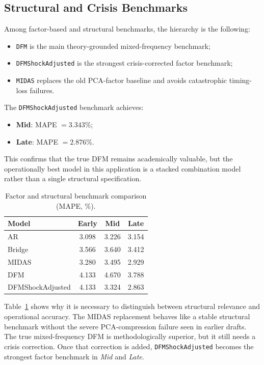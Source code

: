 \documentclass[12pt,a4paper]{report}
\begin{document}
\subsection{Structural and Crisis Benchmarks}

Among factor-based and structural benchmarks, the hierarchy is the following:
\begin{itemize}
    \item \texttt{DFM} is the main theory-grounded mixed-frequency benchmark;
    \item \texttt{DFMShockAdjusted} is the strongest crisis-corrected factor benchmark;
    \item \texttt{MIDAS} replaces the old PCA-factor baseline and avoids catastrophic timing-loss failures.
\end{itemize}

The \texttt{DFMShockAdjusted} benchmark achieves:
\begin{itemize}
    \item \textbf{Mid}: MAPE $= 3.343\%$;
    \item \textbf{Late}: MAPE $= 2.876\%$.
\end{itemize}

This confirms that the true DFM remains academically valuable, but the operationally best model in this application is a stacked combination model rather than a single structural specification.

\begin{table}[H]
    \centering
    \caption{Factor and structural benchmark comparison (MAPE, \%).}
    \label{tab:factor_comparison}
    \begin{tabular}{lccc}
        \hline
        Model & Early & Mid & Late \\
        \hline
        AR & 3.098 & 3.226 & 3.154 \\
        Bridge & 3.566 & 3.640 & 3.412 \\
        MIDAS & 3.280 & 3.495 & 2.929 \\
        DFM & 4.133 & 4.670 & 3.788 \\
        DFMShockAdjusted & 4.133 & 3.324 & 2.863 \\
        \hline
    \end{tabular}
\end{table}

Table~\ref{tab:factor_comparison} shows why it is necessary to distinguish between structural relevance and operational accuracy. The MIDAS replacement behaves like a stable structural benchmark without the severe PCA-compression failure seen in earlier drafts. The true mixed-frequency DFM is methodologically superior, but it still needs a crisis correction. Once that correction is added, \texttt{DFMShockAdjusted} becomes the strongest factor benchmark in \textit{Mid} and \textit{Late}.
\end{document}
